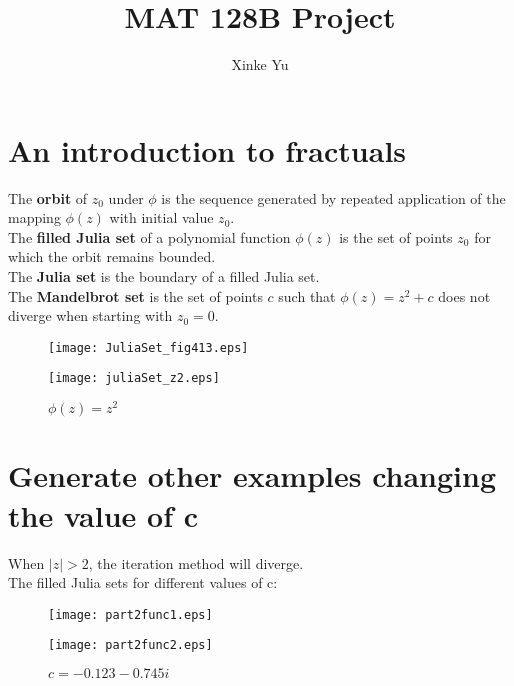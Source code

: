 \documentclass[11pt]{article}
\title{MAT 128B  Project}
\author{Xinke Yu}
\date{}							%
\begin{document}
\maketitle

\section{An introduction to fractuals}
The \textbf{orbit}  of $z_0$ under $\phi$ is the sequence generated by repeated application of the mapping $\phi (z)$ with initial value $z_0$.\\
The \textbf{filled Julia set} of a polynomial function $\phi(z)$ is the set of points $z_0$ for which the orbit remains bounded.\\
The \textbf{Julia set} is the boundary of a filled Julia set.\\
The \textbf{Mandelbrot set} is the set of points $c$ such that $\phi(z) = z^2 + c$ does not diverge when starting with $z_0 = 0$.\\
\begin{figure}[!hbp]
  \centering
  \begin{minipage}[b]{0.45\textwidth}
    \texttt{[image: JuliaSet\_fig413.eps]}
    \caption{$\phi(z)=z^2-1.25$}
  \end{minipage}
  \hfill
  \begin{minipage}[b]{0.45\textwidth}
    \texttt{[image: juliaSet\_z2.eps]}
    \caption{$\phi(z)=z^2$}
  \end{minipage}
\end{figure}


\section{Generate other examples changing the value of c}
When $|z|> 2$, the iteration method will diverge.\\
The filled Julia sets for different values of c:\\
\begin{figure}[H]
  \centering
  \begin{minipage}[b]{0.45\textwidth}
    \texttt{[image: part2func1.eps]}
    \caption{$c = 0.36 + 0.1i$}
  \end{minipage}
  \hfill
  \begin{minipage}[b]{0.45\textwidth}
    \texttt{[image: part2func2.eps]}
    \caption{$c = -0.123 - 0.745i$}
  \end{minipage}
   \end{figure}
   
\end{document}
